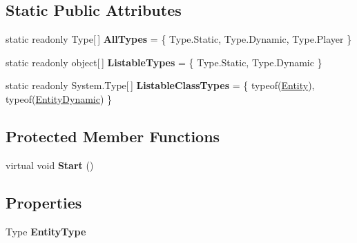 \subsection*{Static Public Attributes}
\begin{DoxyCompactItemize}
\item 
\hypertarget{class_skyrates_1_1_common_1_1_entity_1_1_entity_aa2264aa396ec6c08519c50f6e872596e}{static readonly Type\mbox{[}$\,$\mbox{]} {\bfseries All\-Types} = \{ Type.\-Static, Type.\-Dynamic, Type.\-Player \}}\label{class_skyrates_1_1_common_1_1_entity_1_1_entity_aa2264aa396ec6c08519c50f6e872596e}

\item 
\hypertarget{class_skyrates_1_1_common_1_1_entity_1_1_entity_adc830384f250e2d5f9b33229d91885ce}{static readonly object\mbox{[}$\,$\mbox{]} {\bfseries Listable\-Types} = \{ Type.\-Static, Type.\-Dynamic \}}\label{class_skyrates_1_1_common_1_1_entity_1_1_entity_adc830384f250e2d5f9b33229d91885ce}

\item 
\hypertarget{class_skyrates_1_1_common_1_1_entity_1_1_entity_a9abf8cce12c295b351195de009cfd007}{static readonly System.\-Type\mbox{[}$\,$\mbox{]} {\bfseries Listable\-Class\-Types} = \{ typeof(\hyperlink{class_skyrates_1_1_common_1_1_entity_1_1_entity}{Entity}), typeof(\hyperlink{class_skyrates_1_1_common_1_1_entity_1_1_entity_dynamic}{Entity\-Dynamic}) \}}\label{class_skyrates_1_1_common_1_1_entity_1_1_entity_a9abf8cce12c295b351195de009cfd007}

\end{DoxyCompactItemize}
\subsection*{Protected Member Functions}
\begin{DoxyCompactItemize}
\item 
\hypertarget{class_skyrates_1_1_common_1_1_entity_1_1_entity_acb5cc7450eefd4c794e9f72e0a422834}{virtual void {\bfseries Start} ()}\label{class_skyrates_1_1_common_1_1_entity_1_1_entity_acb5cc7450eefd4c794e9f72e0a422834}

\end{DoxyCompactItemize}
\subsection*{Properties}
\begin{DoxyCompactItemize}
\item 
\hypertarget{class_skyrates_1_1_common_1_1_entity_1_1_entity_a70e062a9c8ae02268ee96724768b5870}{Type {\bfseries Entity\-Type}}\label{class_skyrates_1_1_common_1_1_entity_1_1_entity_a70e062a9c8ae02268ee96724768b5870}

\end{DoxyCompactItemize}


